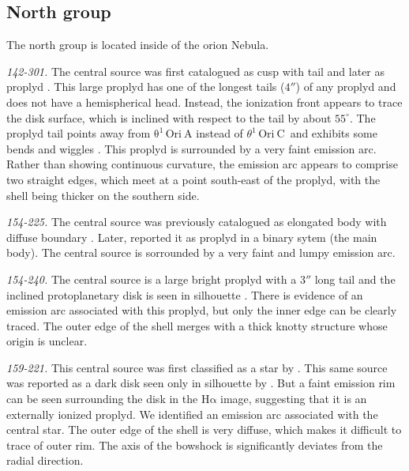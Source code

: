 \documentclass[iop, apj]{emulateapj}
\newcommand\ha{\ensuremath{\mathrm{H\alpha}}}
\newcommand\thC{\ensuremath{\theta^1\,\mathrm{Ori~C}}}
\renewcommand\clearpage{}
\begin{document}
\clearpage
\subsection{North group}
\label{sec:n-group}



The north group is located inside of the orion Nebula.

\textit{142-301.} The central source was first catalogued as cusp with tail \citep{ODell:1996a} and later as proplyd \citep{Bally:2000a, Ricci:2008a}. This large proplyd has one of the longest tails (\(4''\)) of any proplyd and does not have a hemispherical head. Instead, the ionization front appears to trace the disk surface, which is inclined with respect to the tail by about $55^{\circ}$. The proplyd tail points away from \(\mathrm{\theta^1\,Ori~A}\) instead of \thC~and exhibits some bends and wiggles \citep{Bally:2000a}. This proplyd is surrounded by a very faint emission arc.  Rather than showing continuous curvature, the emission arc appears to comprise two straight edges, which meet at a point south-east of the proplyd, with the shell being thicker on the southern side.

\textit{154-225.} The central source was previously catalogued as elongated body with diffuse boundary \citep{ODell:1996a}. Later, \citet{Ricci:2008a} reported it as proplyd in a binary sytem (the main body). The central source is sorrounded by a very faint and lumpy emission arc.

\textit{154-240.} The central source is a large bright proplyd \cite{Bally:2000a, Ricci:2008a} with a \(3''\) long tail and the inclined protoplanetary disk is seen in silhouette \citep{Bally:2000a}. There is evidence of an emission arc associated with this proplyd, but only the inner edge can be clearly traced. The outer edge of the shell merges with a thick knotty structure whose origin is unclear.

\textit{159-221.} This central source was first classified as a star by \citet{ODell:1996a}. This same source was reported as a dark disk seen only in silhouette by \citet{Ricci:2008a}. But a faint emission rim can be seen surrounding the disk in the \ha{} image, suggesting that it is an externally ionized proplyd. We identified an emission arc associated with the central star. The outer edge of the shell is very diffuse, which  makes it difficult to trace of outer rim. The axis of the bowshock is significantly deviates from the radial direction.
\end{document}
